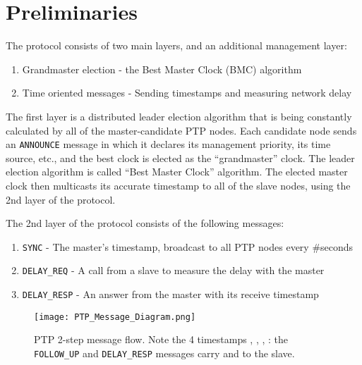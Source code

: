 \documentclass[11pt]{article}
\begin{document}
\section{Preliminaries}

The protocol consists of two main layers, and an additional management layer:

\begin{enumerate}

  \item Grandmaster election - the Best Master Clock (BMC) algorithm

  \item Time oriented messages - Sending timestamps and measuring network delay

\end{enumerate}

The first layer is a distributed leader election algorithm that is being constantly calculated by all of the master-candidate PTP nodes. Each candidate node sends an \texttt{ANNOUNCE} message in which it declares its management priority, its time source, etc., and the best clock is elected as the ``grandmaster'' clock. The leader election algorithm is called ``Best Master Clock'' algorithm. The elected master clock then multicasts its accurate timestamp to all of the slave nodes, using the 2nd layer of the protocol. 



The 2nd layer of the protocol consists of the following messages:

\begin{enumerate}

  \item \texttt{SYNC} - The master's timestamp, broadcast to all PTP nodes every \#seconds

  \item \texttt{DELAY_REQ} - A call from a slave to measure the delay with the master

  \item \texttt{DELAY_RESP} - An answer from the master with its receive timestamp

\end{enumerate}



\begin{figure}[t]

\centerline{\texttt{[image: PTP\_Message\_Diagram.png]}}

\caption{PTP 2-step message flow. Note the 4 timestamps , , , : the \texttt{FOLLOW_UP} and \texttt{DELAY_RESP} messages carry  and  to the slave.}

\label{Messages}

\end{figure}
\end{document}
